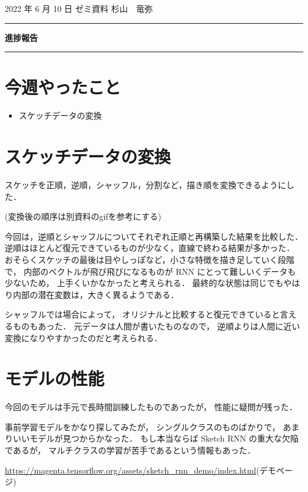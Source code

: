 \documentclass[onecolumn]{ujarticle}   %
\begin{document}

		\noindent
		\hspace{1em}
		2022 年 6 月 10 日
		ゼミ資料
		\hfill
		杉山　竜弥
		\vspace{2mm}

		\hrule
		\begin{center}
			{\Large \bf 進捗報告}
		\end{center}
		\hrule
		\vspace{9mm}


\section{今週やったこと}
\begin{itemize}
  \item スケッチデータの変換
\end{itemize}

\section{スケッチデータの変換}
スケッチを正順，逆順，シャッフル，分割など，描き順を変換できるようにした．

(変換後の順序は別資料のgifを参考にする)

今回は，逆順とシャッフルについてそれぞれ正順と再構築した結果を比較した．
逆順はほとんど復元できているものが少なく，直線で終わる結果が多かった．
おそらくスケッチの最後は目やしっぽなど，小さな特徴を描き足していく段階で，
内部のベクトルが飛び飛びになるものが RNN にとって難しいくデータも少ないため，
上手くいかなかったと考えられる．
最終的な状態は同じでもやはり内部の潜在変数は，大きく異るようである．

シャッフルでは場合によって，
オリジナルと比較すると復元できていると言えるものもあった．
元データは人間が書いたものなので，
逆順よりは人間に近い変換になりやすかったのだと考えられる．

\section{モデルの性能}
今回のモデルは手元で長時間訓練したものであったが，
性能に疑問が残った．

事前学習モデルをかなり探してみたが，
シングルクラスのものばかりで，
あまりいいモデルが見つからかなった．
もし本当ならば Sketch RNN の重大な欠陥であるが，
マルチクラスの学習が苦手であるという情報もあった．

\url{https://magenta.tensorflow.org/assets/sketch_rnn_demo/index.html}(デモページ)
\end{document}
